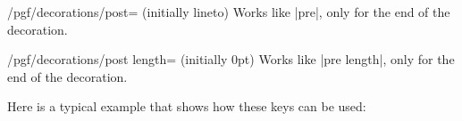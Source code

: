 \begin{key}{/pgf/decorations/post= (initially lineto)}
    Works like |pre|, only for the end of the decoration.
\end{key}

\begin{key}{/pgf/decorations/post length= (initially 0pt)}
    Works like |pre length|, only for the end of the decoration.
\end{key}

Here is a typical example that shows how these keys can be used:
%
\begin{codeexample}[preamble={\usetikzlibrary{decorations.pathmorphing}}]
\end{codeexample}
